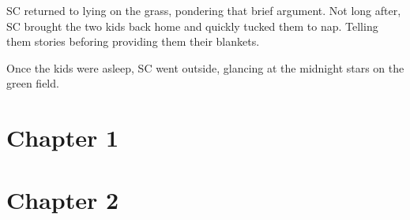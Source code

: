 \documentclass{article}
\begin{document}
SC returned to lying on the grass, pondering that brief
argument. Not long after, SC brought the two kids back
home and quickly tucked them to nap. Telling them stories
beforing providing them their blankets.

Once the kids were asleep, SC went outside, glancing at
the midnight stars on the green field.

\section*{Chapter 1}

\section*{Chapter 2}
\end{document}
